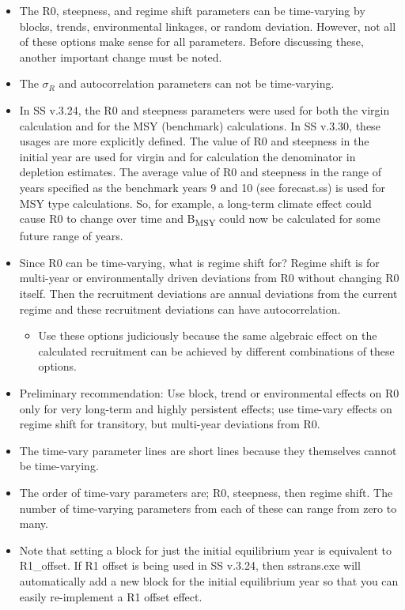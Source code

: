 \begin{itemize}
	\item The R0, steepness, and regime shift parameters can be time-varying by blocks, trends, environmental linkages, or random deviation. However, not all of these options make sense for all parameters. Before discussing these, another important change must be noted.
	
	\item The $\sigma_R$ and autocorrelation parameters can not be time-varying. 
	
	\item In SS v.3.24, the R0 and steepness parameters were used for both the virgin calculation and for the MSY (benchmark) calculations. In SS v.3.30, these usages are more explicitly defined. The value of R0 and steepness in the initial year are used for virgin and for calculation the denominator in depletion estimates. The average value of R0 and steepness in the range of years specified as the benchmark years 9 and 10 (see forecast.ss) is used for MSY type calculations. So, for example, a long-term climate effect could cause R0 to change over time and B\textsubscript{MSY} could now be calculated for some future range of years.
	
	\item Since R0 can be time-varying, what is regime shift for? Regime shift is for multi-year or environmentally driven deviations from R0 without changing R0 itself. Then the recruitment deviations are annual deviations from the current regime and these recruitment deviations can have autocorrelation.
	
	\begin{itemize}
		\item Use these options judiciously because the same algebraic effect on the calculated recruitment can be achieved by different combinations of these options.
	\end{itemize}
	
	\item Preliminary recommendation: Use block, trend or environmental effects on R0 only for very long-term and highly persistent effects; use time-vary effects on regime shift for transitory, but multi-year deviations from R0.
	
	\item The time-vary parameter lines are short lines because they themselves cannot be time-varying.
	
	\item The order of time-vary parameters are; R0, steepness, then regime shift. The number of time-varying parameters from each of these can range from zero to many. 

	\item Note that setting a block for just the initial equilibrium year is equivalent to R1\_offset. If R1 offset is being used in SS v.3.24, then sstrans.exe will automatically add a new block for the initial equilibrium year so that you can easily re-implement a R1 offset effect.
\end{itemize}


